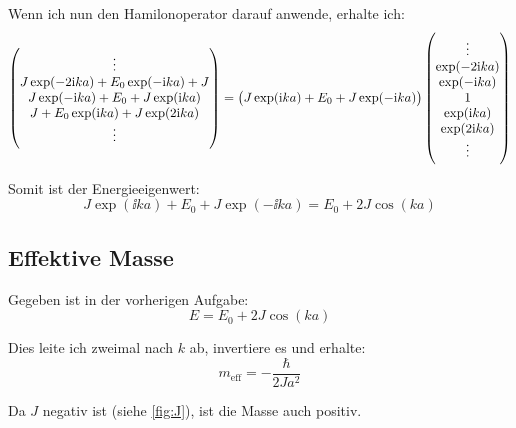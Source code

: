 Wenn ich nun den Hamilonoperator darauf anwende, erhalte ich:
\[
	\begin{pmatrix}
		\vdots \\
		J \exp(-2\ii ka) + E_0 \exp(-\ii ka) + J \\
		J \exp(-\ii ka) + E_0 + J \exp(\ii ka) \\
		J + E_0 \exp(\ii ka) + J \exp(2\ii ka) \\
		\vdots \\
	\end{pmatrix}
	=
	\del{J \exp(\ii ka) + E_0 + J \exp(-\ii ka)}
	\begin{pmatrix}
		\vdots \\
		\exp(-2 \ii k a) \\
		\exp(- \ii k a) \\
		1 \\
		\exp(\ii k a) \\
		\exp(2 \ii k a) \\
		\vdots \\
	\end{pmatrix}
\]

Somit ist der Energieeigenwert:
\[
	J \exp(\ii ka) + E_0 + J \exp(-\ii ka)
	=
	E_0 + 2 J \cos(ka)
\]

\subsection{Effektive Masse}

Gegeben ist in der vorherigen Aufgabe:
\[
	E = E_0 + 2 J \cos(ka)
\]

Dies leite ich zweimal nach $k$ ab, invertiere es und erhalte:
\[
	m_\text{eff} = - \frac{\hbar}{2Ja^2}
\]

Da $J$ negativ ist (siehe \cref{fig:J}), ist die Masse auch positiv.


\IfFileExists{\bibliographyfile}{
	
}{}



